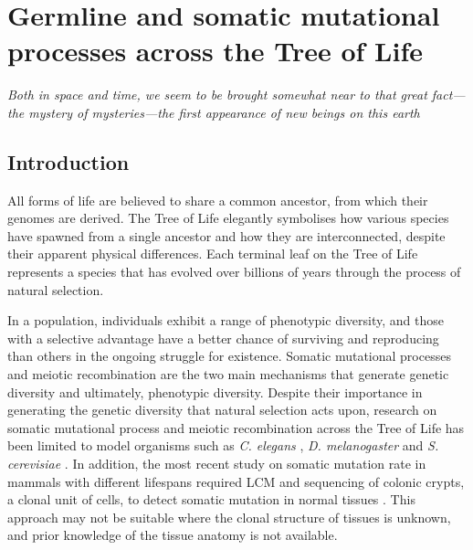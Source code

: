 \chapter{Germline and somatic mutational processes across the Tree of Life}

\ifpdf
    \graphicspath{{Chapter3/Figs/Raster/}{Chapter3/Figs/PDF/}{Chapter3/Figs/}}
\else
    \graphicspath{{Chapter3/Figs/Vector/}{Chapter3/Figs/}}
\fi

\textit{Both in space and time, we seem to be brought somewhat near to that great fact—the mystery of mysteries—the first appearance of new beings on this earth}
\begin{flushright}  \cite{Darwin1859} \end{flushright}

\section{Introduction}

All forms of life are believed to share a common ancestor, from which their genomes are derived. The Tree of Life elegantly symbolises how various species have spawned from a single ancestor and how they are interconnected, despite their apparent physical differences. Each terminal leaf on the Tree of Life represents a species that has evolved over billions of years through the process of natural selection.

In a population, individuals exhibit a range of phenotypic diversity, and those with a selective advantage have a better chance of surviving and reproducing than others in the ongoing struggle for existence.  Somatic mutational processes and meiotic recombination are the two main mechanisms that generate genetic diversity and ultimately, phenotypic diversity.  Despite their importance in generating the genetic diversity that natural selection acts upon, research on somatic mutational process and meiotic recombination across the Tree of Life has been limited to model organisms such as \textit{C. elegans} \cite{Meier2018-cj}, \textit{D. melanogaster} \cite{McKim2002-hm} and \textit{S. cerevisiae} \cite{Gerton2000-lw}. In addition, the most recent study on somatic mutation rate in mammals with different lifespans required LCM and sequencing of colonic crypts, a clonal unit of cells, to detect somatic mutation in normal tissues \cite{Cagan2022-yn}.  This approach may not be suitable where the clonal structure of tissues is unknown, and prior knowledge of the tissue anatomy is not available. 

